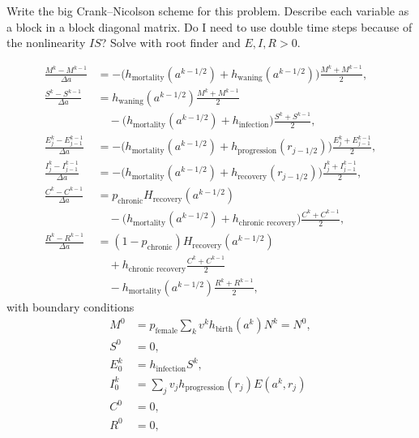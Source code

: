 \documentclass[12pt]{article}
\begin{document}
Write the big Crank--Nicolson scheme for this problem.  Describe each
variable as a block in a block diagonal matrix.  Do I need to
use double time steps because of the nonlinearity $I S$?
Solve with root finder and $E, I, R > 0$.

\begin{equation}
  \begin{split}
    \frac{M^k - M^{k - 1}}{\Delta a}
    &= - \big(h_{\text{mortality}}(a^{k - 1/2})
    + h_{\text{waning}}(a^{k - 1 / 2})\big)
    \frac{M^k + M^{k - 1}}{2},
    \\
    \frac{S^k - S^{k - 1}}{\Delta a}
    &= h_{\text{waning}}(a^{k - 1 / 2})
    \frac{M^k + M^{k - 1}}{2}
    \\ & \quad {}
    - \big(h_{\text{mortality}}(a^{k - 1 / 2})
    + h_{\text{infection}}\big)
    \frac{S^k + S^{k - 1}}{2},
    \\
    \frac{E_j^k - E_{j - 1}^{k - 1}}{\Delta a}
    &=- \big(h_{\text{mortality}}(a^{k - 1 / 2})
    + h_{\text{progression}}(r_{j - 1 / 2})\big)
    \frac{E_j^k + E_{j - 1}^{k - 1}}{2},
    \\
    \frac{I_j^k - I_{j - 1}^{k - 1}}{\Delta a}
    &= - \big(h_{\text{mortality}}(a^{k - 1 / 2})
    + h_{\text{recovery}}(r_{j - 1 / 2})\big)
    \frac{I_j^k + I_{j - 1}^{k - 1}}{2},
    \\
    \frac{C^k - C^{k - 1}}{\Delta a}
    &= p_{\text{chronic}} H_{\text{recovery}}(a^{k - 1 / 2})
    \\ & \quad {}
    - \big(h_{\text{mortality}}(a^{k - 1 / 2})
    + h_{\text{chronic recovery}}\big) \frac{C^k + C^{k - 1}}{2},
    \\
    \frac{R^k - R^{k - 1}}{\Delta a}
    &= (1 - p_{\text{chronic}}) H_{\text{recovery}}(a^{k - 1 / 2})
    \\ & \quad {}
    + h_{\text{chronic recovery}} \frac{C^k + C^{k - 1}}{2}
    \\ & \quad {}
    - h_{\text{mortality}}(a^{k - 1 / 2}) \frac{R^k + R^{k - 1}}{2},
  \end{split}
\end{equation}
with boundary conditions
\begin{equation}
  \begin{split}
    M^0
    &= p_{\text{female}}
    \sum_k v^k h_{\text{birth}}(a^k) N^k
    = N^0,
    \\
    S^0 &= 0,
    \\
    E_0^k &= h_{\text{infection}} S^k,
    \\
    I_0^k &= \sum_j v_j h_{\text{progression}}(r_j) E(a^k, r_j)
    \\
    C^0 &= 0,
    \\
    R^0 &= 0,
  \end{split}
\end{equation}
\end{document}
